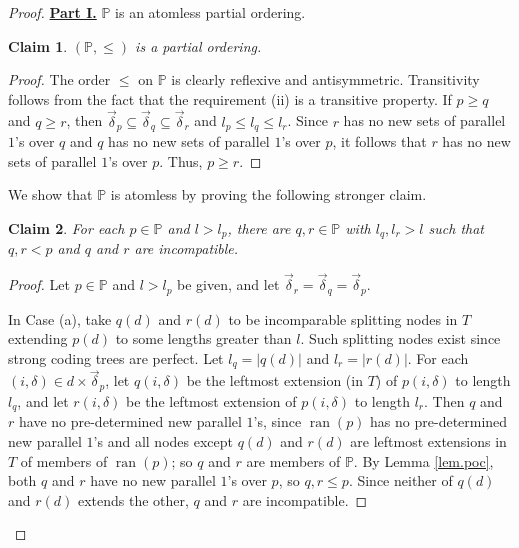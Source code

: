 \documentclass{amsart}
\newtheorem{claim}{Claim}
\theoremstyle{remark}
\theoremstyle{definition}
\theoremstyle{remark}
\newcommand{\sse}{\subseteq}
\DeclareMathOperator{\ran}{ran}
\newcommand{\bP}{\mathbb{P}}
\begin{document}
\begin{proof}
\noindent \underline{\bf {Part I.}} $\bP$ is an atomless partial ordering.



\begin{claim}\label{claim.atomless_separative}
 $(\bP,\le)$ is a partial ordering.
\end{claim}


\begin{proof}
The  order  $\le$ on $\bP$ is clearly  reflexive and antisymmetric.
Transitivity follows from the fact that the requirement (ii) is a transitive property.
If $p\ge q$ and $q\ge r$,
then $\vec{\delta}_p\sse\vec{\delta}_q\sse \vec{\delta}_r$ and $l_p\le l_q\le l_r$.
Since
$r$
has no new sets of parallel $1$'s over
 $q$
and
$q$
has no new sets of parallel $1$'s over
 $p$,
it follows that
$r$
has no new sets of parallel $1$'s over
$p$.
Thus, $p\ge r$.
\end{proof}


We show that $\bP$ is atomless by proving the  following stronger claim.





\begin{claim}\label{claim.densehigh}
For each $p\in\bP$ and   $l>l_p$, there
are  $q,r\in\bP$ with $l_q,l_r> l$  such that  $q,r<p$ and $q$ and $r$ are incompatible.
\end{claim}


\begin{proof}
Let $p\in \bP$ and $l>l_p$ be given, and
let $\vec{\delta}_r=\vec{\delta}_q=\vec{\delta}_p$.



In Case (a),
take $q(d)$ and $r(d)$ to be incomparable splitting nodes in $T$ extending $p(d)$ to some lengths greater than $l$.
Such splitting nodes exist since strong coding trees are perfect.
Let $l_q=|q(d)|$ and $l_r=|r(d)|$.
For each $(i,\delta)\in d\times\vec{\delta}_p$,
let $q(i,\delta)$ be the leftmost extension (in $T$) of $p(i,\delta)$ to length $l_q$,
and  let
$r(i,\delta)$ be the leftmost extension of $p(i,\delta)$ to length $l_r$.
Then $q$ and $r$ have no  pre-determined  new parallel $1$'s, since $\ran(p)$    has no pre-determined new parallel $1$'s and all nodes except $q(d)$ and $r(d)$ are leftmost extensions in $T$ of members of $\ran(p)$;
so $q$ and $r$ are members of $\bP$.
By Lemma \ref{lem.poc},
both $q$ and $r$
 have no new  parallel $1$'s over $p$,
so  $q,r\le p$.
Since neither of $q(d)$ and $r(d)$ extends the other,
$q$ and $r$ are incompatible.




\end{proof}
\end{proof}
\end{document}
